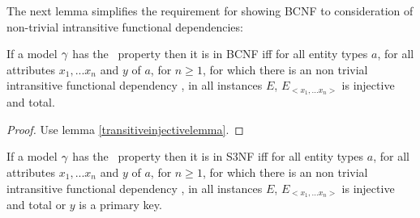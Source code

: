 \noindent The next lemma simplifies the requirement for showing BCNF to consideration of non-trivial
intransitive functional dependencies:
\begin{lemma}
\label{BCNFsublemma}
If a model $\gamma$ has the \fdfactoring\ property then it is in BCNF iff
for all entity types $a$, for all attributes $x_1,...x_n$ and $y$ of $a$, for $n \geq 1$, 
for which there is an non trivial  intransitive functional dependency ,
in all instances $E$, $E_{<x_1,...x_n>}$ is injective and total. 
\end{lemma}
\begin{proof}Use lemma \ref{transitiveinjectivelemma}.
\end{proof}
\begin{lemma}
\label{S3NFsublemma}
If a model $\gamma$ has the \fdfactoring\ property then it is in S3NF iff
for all entity types $a$, for all attributes $x_1,...x_n$ and $y$ of $a$, for $n \geq 1$, 
for which there is an non trivial intransitive functional dependency ,
in all instances $E$, $E_{<x_1,...x_n>}$ is injective and total or $y$ is a primary key. 
\end{lemma}



